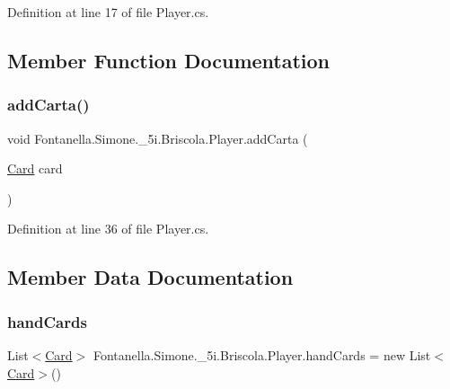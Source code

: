 Definition at line 17 of file Player.\+cs.



\subsection{Member Function Documentation}
\hypertarget{class_fontanella_1_1_simone_1_1__5i_1_1_briscola_1_1_player_ac4efbc7a4c7809d9a54cefdba76cf771}{}\label{class_fontanella_1_1_simone_1_1__5i_1_1_briscola_1_1_player_ac4efbc7a4c7809d9a54cefdba76cf771} 
\subsubsection{\texorpdfstring{add\+Carta()}{addCarta()}}
{\footnotesize\ttfamily void Fontanella.\+Simone.\+\_\+5i.\+Briscola.\+Player.\+add\+Carta (\begin{DoxyParamCaption}\item[{\hyperlink{class_fontanella_1_1_simone_1_1__5i_1_1_briscola_1_1_card}{Card}}]{card }\end{DoxyParamCaption})}



Definition at line 36 of file Player.\+cs.



\subsection{Member Data Documentation}
\hypertarget{class_fontanella_1_1_simone_1_1__5i_1_1_briscola_1_1_player_aea76897ad4738640a6d4a06c553a4453}{}\label{class_fontanella_1_1_simone_1_1__5i_1_1_briscola_1_1_player_aea76897ad4738640a6d4a06c553a4453} 
\subsubsection{\texorpdfstring{hand\+Cards}{handCards}}
{\footnotesize\ttfamily List$<$\hyperlink{class_fontanella_1_1_simone_1_1__5i_1_1_briscola_1_1_card}{Card}$>$ Fontanella.\+Simone.\+\_\+5i.\+Briscola.\+Player.\+hand\+Cards = new List$<$\hyperlink{class_fontanella_1_1_simone_1_1__5i_1_1_briscola_1_1_card}{Card}$>$()}



